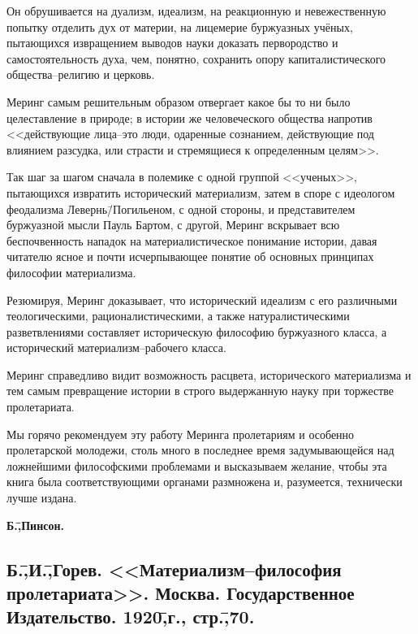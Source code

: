 Он обрушивается на дуализм, идеализм, на реакционную и невежественную попытку отделить дух от материи, на лицемерие буржуазных учёных, пытающихся извращением выводов науки доказать первородство и самостоятельность духа, чем, понятно, сохранить опору капиталистического общества\---религию и церковь.

Меринг самым решительным образом отвергает какое бы то ни было целеставление в природе; в истории же человеческого общества напротив <<действующие лица\---это люди, одаренные сознанием, действующие под влиянием разсудка, или страсти и стремящиеся к определенным целям>>.

Так шаг за шагом сначала в полемике с одной группой <<ученых>>, пытающихся извратить исторический материализм, затем в споре с идеологом феодализма Левернь\=/Погильеном, с одной стороны, и представителем буржуазной мысли Пауль Бартом, с другой, Меринг вскрывает всю беспочвенность нападок на материалистическое понимание истории, давая читателю ясное и почти исчерпывающее понятие об основных принципах философии материализма.

Резюмируя, Меринг доказывает, что исторический идеализм с его различными теологическими, рационалистическими, а также натуралистическими разветвлениями составляет историческую философию буржуазного класса, а исторический материализм\---рабочего класса.

Меринг справедливо видит возможность расцвета, исторического материализма и тем самым превращение истории в строго выдержанную науку при торжестве пролетариата.

Мы горячо рекомендуем эту работу Меринга пролетариям и особенно пролетарской молодежи, столь много в последнее время задумывающейся над ложнейшими философскими проблемами и высказываем желание, чтобы эта книга была соответствующими органами размножена и, разумеется, технически лучше издана.

\begin{flushright}
 \textbf{Б.\=,Пинсон.}\hspace*{2em}
\end{flushright}

\subsection*{Б.\=,И.\=,Горев. <<Материализм\---философия пролетариата>>. Москва. Государственное Издательство. 1920\=,г., стр.\=,70.}
\label{subsec:10.6}

